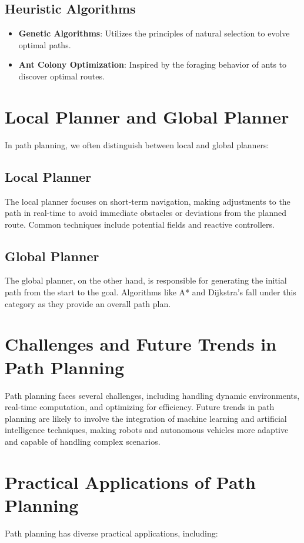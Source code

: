 \documentclass{article}
\begin{document}
\subsection{Heuristic Algorithms}
\begin{itemize}
    \item \textbf{Genetic Algorithms}: Utilizes the principles of natural selection to evolve optimal paths.
    \item \textbf{Ant Colony Optimization}: Inspired by the foraging behavior of ants to discover optimal routes.
\end{itemize}

\section{Local Planner and Global Planner}
In path planning, we often distinguish between local and global planners:

\subsection{Local Planner}
The local planner focuses on short-term navigation, making adjustments to the path in real-time to avoid immediate obstacles or deviations from the planned route. Common techniques include potential fields and reactive controllers.

\subsection{Global Planner}
The global planner, on the other hand, is responsible for generating the initial path from the start to the goal. Algorithms like A* and Dijkstra's fall under this category as they provide an overall path plan.

\section{Challenges and Future Trends in Path Planning}
Path planning faces several challenges, including handling dynamic environments, real-time computation, and optimizing for efficiency. Future trends in path planning are likely to involve the integration of machine learning and artificial intelligence techniques, making robots and autonomous vehicles more adaptive and capable of handling complex scenarios.

\section{Practical Applications of Path Planning}
Path planning has diverse practical applications, including:
\end{document}
